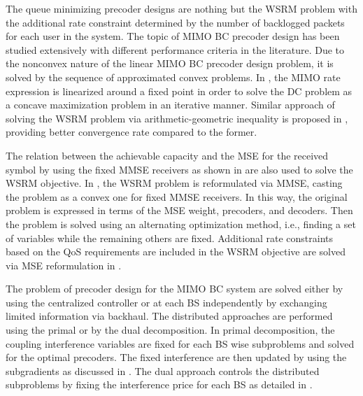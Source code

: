 The queue minimizing precoder designs are nothing but the \ac{WSRM} problem with the additional rate constraint determined by the number of backlogged packets for each user in the system. The topic of \ac{MIMO} \ac{BC} precoder design has been studied extensively with different performance criteria in the literature. Due to the nonconvex nature of the linear \ac{MIMO} \ac{BC} precoder design problem, it is solved by the sequence of approximated convex problems. In \cite{sin_algorithm}, the \ac{MIMO} rate expression is linearized around a fixed point in order to solve the \ac{DC} problem as a concave maximization problem in an iterative manner. Similar approach of solving the \ac{WSRM} problem via arithmetic-geometric inequality is proposed in \cite{tran2012fast}, providing better convergence rate compared to the former.

The relation between the achievable capacity and the \ac{MSE} for the received symbol by using the fixed \ac{MMSE} receivers as shown in \cite{viswanath1999optimal,mse_duality} are also used to solve the \ac{WSRM} objective. In \cite{christensen2008weighted,wmmse_shi}, the \ac{WSRM} problem is reformulated via \ac{MMSE}, casting the problem as a convex one for fixed \ac{MMSE} receivers. In this way, the original problem is expressed in terms of the \ac{MSE} weight, precoders, and decoders. Then the problem is solved using an alternating optimization method, i.e., finding a set of variables while the remaining others are fixed. Additional rate constraints based on the \ac{QoS} requirements are included in the \ac{WSRM} objective are solved via \ac{MSE} reformulation in \cite{kaleva2013primal}.

The problem of precoder design for the \ac{MIMO} \ac{BC} system are solved either by using the centralized controller or at each \ac{BS} independently by exchanging limited information via backhaul. The distributed approaches are performed using the primal or by the dual decomposition. In primal decomposition, the coupling interference variables are fixed for each \ac{BS} wise subproblems and solved for the optimal precoders. The fixed interference are then updated by using the subgradients as discussed in \cite{pennanen2011decentralized}. The dual approach controls the distributed subproblems by fixing the interference price for each \ac{BS} as detailed in \cite{tolli2011decentralized}.

